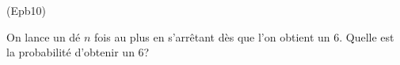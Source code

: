 \begin{tiny}(Epb10)\end{tiny} On lance un dé $n$ fois au plus en s'arrêtant dès que l'on obtient un 6. Quelle est la probabilité d'obtenir un 6?  